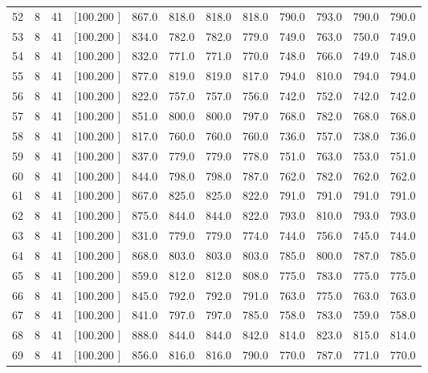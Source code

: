 \documentclass[12pt,a4paper]{article}
\begin{document}
\begin{center}
{\begin{tabular}{r r r r r r r r r r r r}
  52&  8& 41&[100.200   ]&   867.0&   818.0&   818.0&   818.0&   790.0&   793.0&   790.0&   790.0\\[-0.02in]
  53&  8& 41&[100.200   ]&   834.0&   782.0&   782.0&   779.0&   749.0&   763.0&   750.0&   749.0\\[-0.02in]
  54&  8& 41&[100.200   ]&   832.0&   771.0&   771.0&   770.0&   748.0&   766.0&   749.0&   748.0\\[-0.02in]
  55&  8& 41&[100.200   ]&   877.0&   819.0&   819.0&   817.0&   794.0&   810.0&   794.0&   794.0\\[-0.02in]
  56&  8& 41&[100.200   ]&   822.0&   757.0&   757.0&   756.0&   742.0&   752.0&   742.0&   742.0\\[-0.02in]
  57&  8& 41&[100.200   ]&   851.0&   800.0&   800.0&   797.0&   768.0&   782.0&   768.0&   768.0\\[-0.02in]
  58&  8& 41&[100.200   ]&   817.0&   760.0&   760.0&   760.0&   736.0&   757.0&   738.0&   736.0\\[-0.02in]
  59&  8& 41&[100.200   ]&   837.0&   779.0&   779.0&   778.0&   751.0&   763.0&   753.0&   751.0\\[-0.02in]
  60&  8& 41&[100.200   ]&   844.0&   798.0&   798.0&   787.0&   762.0&   782.0&   762.0&   762.0\\[-0.02in]
  61&  8& 41&[100.200   ]&   867.0&   825.0&   825.0&   822.0&   791.0&   791.0&   791.0&   791.0\\[-0.02in]
  62&  8& 41&[100.200   ]&   875.0&   844.0&   844.0&   822.0&   793.0&   810.0&   793.0&   793.0\\[-0.02in]
  63&  8& 41&[100.200   ]&   831.0&   779.0&   779.0&   774.0&   744.0&   756.0&   745.0&   744.0\\[-0.02in]
  64&  8& 41&[100.200   ]&   868.0&   803.0&   803.0&   803.0&   785.0&   800.0&   787.0&   785.0\\[-0.02in]
  65&  8& 41&[100.200   ]&   859.0&   812.0&   812.0&   808.0&   775.0&   783.0&   775.0&   775.0\\[-0.02in]
  66&  8& 41&[100.200   ]&   845.0&   792.0&   792.0&   791.0&   763.0&   775.0&   763.0&   763.0\\[-0.02in]
  67&  8& 41&[100.200   ]&   841.0&   797.0&   797.0&   785.0&   758.0&   783.0&   759.0&   758.0\\[-0.02in]
  68&  8& 41&[100.200   ]&   888.0&   844.0&   844.0&   842.0&   814.0&   823.0&   815.0&   814.0\\[-0.02in]
  69&  8& 41&[100.200   ]&   856.0&   816.0&   816.0&   790.0&   770.0&   787.0&   771.0&   770.0\\[-0.02in]

\end{tabular}}
\end{center}
\end{document}
